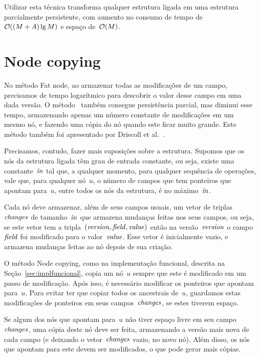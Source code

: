 \documentclass[../../main.tex]{subfiles}
\begin{document}
Utilizar esta técnica transforma qualquer estrutura ligada em uma estrutura parcialmente persistente, com aumento no consumo de tempo de~$\mathcal{O}((M+A) \lg{M})$ e espaço de~$\mathcal{O}(M)$.

\section{Node copying} \label{sec:nodecopying}

No método Fat node, ao armazenar todas as modificações de um campo, precisamos de tempo logarítmico para descobrir o valor desse campo em uma dada versão. O método~ também consegue persistência parcial, mas diminui esse tempo, armazenando apenas um número constante de modificações em um mesmo nó, e fazendo uma cópia do nó quando este ficar muito grande. Este método também foi apresentado por Driscoll et al.~\cite{DriscollSST1989}.

Precisamos, contudo, fazer mais suposições sobre a estrutura. Supomos que os nós da estrutura ligada têm grau de entrada constante, ou seja, existe uma constante~$\mathit{in}$ tal que, a qualquer momento, para qualquer sequência de operações, vale que, para qualquer nó~$u$, o número de campos que tem ponteiros que apontam para~$u$, entre todos os nós da estrutura, é no máximo~$\mathit{in}$.

\newcommand{\changes}{\V{changes}}
\newcommand{\parents}{\V{parents}}
\newcommand{\ts}{\mathcal{T}}
\newcommand{\cp}{\V{copy}}
\newcommand{\version}{\V{version}}
\newcommand{\entry}{\V{entry}}

Cada nó deve armazenar, além de seus campos usuais, um vetor de triplas~$\mathit{changes}$ de tamanho~$\mathit{in}$ que armazena mudanças feitas nos seus campos, ou seja, se este vetor tem a tripla~${(\mathit{version}, \mathit{field}, \mathit{value})}$ então na versão~$\mathit{version}$ o campo~$\mathit{field}$ foi modificado para o valor~$\mathit{value}$. Esse vetor é inicialmente vazio, e armazena mudanças feitas ao nó depois de sua criação.

O método Node copying, como na implementação funcional, descrita na Seção~\ref{sec:implfuncional}, copia um nó~$u$ sempre que este é modificado em um passo de modificação. Após isso, é necessário modificar os ponteiros que apontam para~$u$. Para evitar ter que copiar todos os ancestrais de~$u$, guardamos estas modificações de ponteiros em seus campos~$\changes$, se estes tiverem espaço.

Se algum dos nós que apontam para~$u$ não tiver espaço livre em seu campo~$\changes$, uma cópia deste nó deve ser feita, armazenando a versão mais nova de cada campo (e deixando o vetor~$\changes$ vazio, no novo nó). Além disso, os nós que apontam para este devem ser modificados, o que pode gerar mais cópias.
\end{document}

